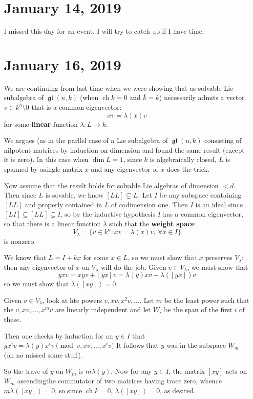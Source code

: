 \documentclass[12pt]{article}
\theoremstyle{nonumberbreak}
\theoremstyle{changebreak}
\theoremstyle{nonumberbreak}
\theoremstyle{change}
\DeclareMathOperator{\ch}{ch}
\DeclareMathOperator{\gl}{\mathfrak{gl}}
\begin{document}
\section{January 14, 2019}
I missed this day for an event. I will try to catch up if I have time.

\section{January 16, 2019}
We are continuing from last time when we were showing that as solvable Lie subalgebra of $\gl(n,k)$
(when $\ch k=0$ and $\bar k=k$) necessarily admits a vector $v\in k^n\setminus 0$ that is
a common eigenvector:
\[xv=\lambda(x)v\]
for some \textbf{linear} function $\lambda:L\to k$.

We argues (as in the parllel case of a Lie subalgebra of $\gl(n,k)$ consisting of nilpotent matrices
by induction on dimension and found the same result (except it is zero). In this case when $\dim L=1$,
since $k$ is algebraically closed, $L$ is spanned by asingle matrix $x$ and any eigenvector of $x$ does the trick.

Now assume that the result holds for solvable Lie algebras of dimension $<d$. Then since $L$ is sovable, we know
$[LL]\subsetneq L$. Let $I$ be any subspace containing $[LL]$ and properly contained in $L$ of codimension one.
Then $I$ is an ideal since $[LI]\subseteq[LL]\subseteq I$, so by the inductive hypothesis $I$ has a common eigenvector, 
so that there is a linear function $\lambda$ such that the \textbf{weight space}
\[V_\lambda=\{v\in k^n:xv=\lambda(x)v,\,\forall x\in I\}\]
is nonzero.

We know that $L=I+kx$ for some $x\in L$, so we must show that $x$ preserves $V_\lambda$: then any eigenvector
of $x$ on $V_\lambda$ will do the job. Given $v\in V_\lambda$, we must show that 
\[yxv=xyv+[yx]v=\lambda(y)xv+\lambda([yx])v\]
so we must show that $\lambda([xy])=0$.

Given $v\in V_\lambda$, look at hte powers $v,xv, x^2v,\dots$. Let $m$ be the least power such that the
$v,xv,\dots,x^mv$ are linearly independent and let $W_i$ be the span of the first $i$ of these.

Then one checks by induction for an $y\in I$ that $yx^iv=\lambda(y)x^iv\pmod{v,xv,\dots,x^iv}$
It follows that $y$ was in the subspace $W_m$ (oh no missed some stuff).

So the trave of $y$ on $W_m$ is $m\lambda(y)$. Now for any $y\in I$, the matrix $[xy]$ acts on $W_m$ ascendingthe commutator of two matrices having trace zero, whence $m\lambda([xy])=0$,
so since $\ch k=0$, $\lambda([xy])=0$, as desired.
\end{document}
